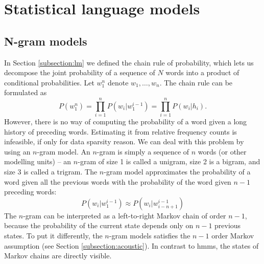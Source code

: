 \chapter{Statistical language models}
\label{chapter:lm}

\section{N-gram models}
\label{section:ngrams}
In Section \ref{subsection:lm} we defined the chain rule of probability, which lets us decompose the joint probability of a sequence of $N$ words into a product of conditional probabilities. Let $w_{1}^{n}$ denote $w_{1}, \dots, w_{n}$. The chain rule can be formulated as
\begin{equation}
	\label{equation:chain}
	P(w_{1}^{n})=\prod_{i=1}^{n}P(w_{i}|w_{1}^{i-1})=\prod_{i=1}^{n}P(w_{i}|h_{i}).
\end{equation}
However, there is no way of computing the probability of a word given a long history of preceding words. Estimating it from relative frequency counts is infeasible, if only for data sparsity reason. We can deal with this problem by using an \mbox{$n$-gram} model. An \mbox{$n$-gram} is simply a sequence of $n$ words (or other modelling units) -- an \mbox{$n$-gram} of size 1 is called a unigram, size 2 is a bigram, and size 3 is called a trigram. The \mbox{$n$-gram} model approximates the probability of a word given all the previous words with the probability of the word given $n-1$ preceding words:
\begin{equation}
	P(w_{i}|w_{1}^{i-1})\approx P(w_{i}|w_{i-n+1}^{i-1})
\end{equation}
The \mbox{$n$-gram} can be interpreted as a left-to-right Markov chain of order $n-1$, because the probability of the current state depends only on $n-1$ previous states. To put it differently, the \mbox{$n$-gram} models satisfies the $n-1$ order Markov assumption (see Section \ref{subsection:acoustic}). In contrast to \glspl{hmm}, the states of Markov chains are directly visible.


